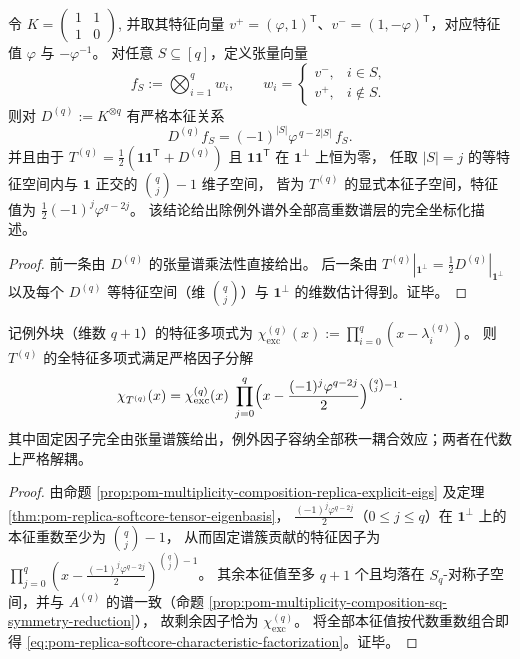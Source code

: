 \begin{theorem}\label{thm:pom-replica-softcore-tensor-eigenbasis}
令
\(
K=\begin{pmatrix}1&1\\[2pt]1&0\end{pmatrix}
\),
并取其特征向量
\(
v^+=(\varphi,1)^{\mathsf T}
\)、\(
v^-=(1,-\varphi)^{\mathsf T}
\)，对应特征值 \(\varphi\) 与 \(-\varphi^{-1}\)。
对任意 \(S\subseteq[q]\)，定义张量向量
\[
f_S:=\bigotimes_{i=1}^{q} w_i,\qquad
w_i=
\begin{cases}
v^-,& i\in S,\\
v^+,& i\notin S.
\end{cases}
\]
则对 \(D^{(q)}:=K^{\otimes q}\) 有严格本征关系
\[
D^{(q)}f_S = (-1)^{|S|}\varphi^{\,q-2|S|}\,f_S.
\]
并且由于
\(
T^{(q)}=\tfrac12(\mathbf{1}\mathbf{1}^{\mathsf T}+D^{(q)})
\)
且 \(\mathbf{1}\mathbf{1}^{\mathsf T}\) 在 \(\mathbf{1}^\perp\) 上恒为零，
任取 \(|S|=j\) 的等特征空间内与 \(\mathbf{1}\) 正交的 \(\binom{q}{j}-1\) 维子空间，
皆为 \(T^{(q)}\) 的显式本征子空间，特征值为
\(
\tfrac12(-1)^j\varphi^{q-2j}
\)。
该结论给出除例外谱外全部高重数谱层的完全坐标化描述。
\end{theorem}
\begin{proof}
前一条由 \(D^{(q)}\) 的张量谱乘法性直接给出。
后一条由
\(
T^{(q)}|_{\mathbf{1}^\perp}=\frac12 D^{(q)}|_{\mathbf{1}^\perp}
\)
以及每个 \(D^{(q)}\) 等特征空间（维 \(\binom{q}{j}\)）与 \(\mathbf{1}^\perp\) 的维数估计得到。证毕。
\end{proof}

\begin{theorem}\label{thm:pom-replica-softcore-characteristic-factorization}
记例外块（维数 \(q+1\)）的特征多项式为
\(
\chi_{\mathrm{exc}}^{(q)}(x):=\prod_{i=0}^{q}(x-\lambda_i^{(q)})
\)。
则 \(T^{(q)}\) 的全特征多项式满足严格因子分解
\begin{equation}\label{eq:pom-replica-softcore-characteristic-factorization}
\chi_{T^{(q)}}(x)
=\chi_{\mathrm{exc}}^{(q)}(x)\;
\prod_{j=0}^{q}\Bigl(x-\frac{(-1)^j\varphi^{q-2j}}{2}\Bigr)^{\binom{q}{j}-1}.
\end{equation}
其中固定因子完全由张量谱簇给出，例外因子容纳全部秩一耦合效应；两者在代数上严格解耦。
\end{theorem}
\begin{proof}
由命题 \ref{prop:pom-multiplicity-composition-replica-explicit-eigs} 及定理 \ref{thm:pom-replica-softcore-tensor-eigenbasis}，
\(\frac{(-1)^j\varphi^{q-2j}}{2}\)（\(0\le j\le q\)）在 \(\mathbf{1}^\perp\) 上的本征重数至少为 \(\binom{q}{j}-1\)，
从而固定谱簇贡献的特征因子为
\(
\prod_{j=0}^{q}(x-\frac{(-1)^j\varphi^{q-2j}}{2})^{\binom{q}{j}-1}
\)。
其余本征值至多 \(q+1\) 个且均落在 \(S_q\)-对称子空间，并与 \(A^{(q)}\) 的谱一致（命题 \ref{prop:pom-multiplicity-composition-sq-symmetry-reduction}），
故剩余因子恰为 \(\chi_{\mathrm{exc}}^{(q)}\)。
将全部本征值按代数重数组合即得 \eqref{eq:pom-replica-softcore-characteristic-factorization}。证毕。
\end{proof}

